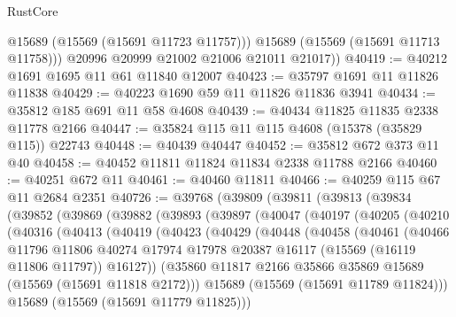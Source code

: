 \begin{lexlean}{RustCore}
\begin{coremodule}
            @15689
            (@15569 (@15691 @11723 @11757)))
          @15689
          (@15569 (@15691 @11713 @11758)))
        @20996
        @20999
        @21002
        @21006
        @21011
        @21017))
@40419 := @40212 @1691 @1695 @11 @61 @11840 @12007
@40423 := @35797 @1691 @11 @11826 @11838
@40429 := @40223 @1690 @59 @11 @11826 @11836 @3941
@40434 := @35812 @185 @691 @11 @58 @4608
@40439 := @40434 @11825 @11835 @2338 @11778 @2166
@40447 := @35824 @115 @11 @115 @4608 (@15378 (@35829 @115)) @22743
@40448 := @40439 @40447
@40452 := @35812 @672 @373 @11 @40
@40458 := @40452 @11811 @11824 @11834 @2338 @11788 @2166
@40460 := @40251 @672 @11
@40461 := @40460 @11811
@40466 := @40259 @115 @67 @11 @2684 @2351
@40726 := @39768
    (@39809
      (@39811
        (@39813
          (@39834
            (@39852
              (@39869
                (@39882
                  (@39893
                    (@39897
                      (@40047
                        (@40197
                          (@40205
                            (@40210
                              (@40316
                                (@40413
                                  (@40419
                                    (@40423
                                      (@40429
                                        (@40448
                                          (@40458
                                            (@40461
                                              (@40466
                                                @11796
                                                @11806
                                                @40274
                                                @17974
                                                @17978
                                                @20387
                                                @16117
                                                (@15569 (@16119 @11806 @11797))
                                                @16127))
                                            (@35860
                                              @11817
                                              @2166
                                              @35866
                                              @35869
                                              @15689
                                              (@15569 (@15691 @11818 @2172)))
                                            @15689
                                            (@15569 (@15691 @11789 @11824)))
                                          @15689
                                          (@15569 (@15691 @11779 @11825)))

\end{coremodule}
\end{lexlean}
